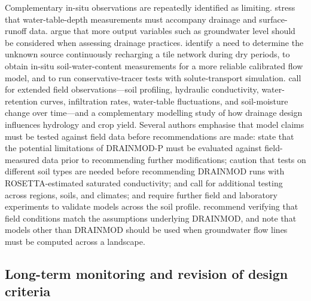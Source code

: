 \documentclass[11pt]{article}
\begin{document}
Complementary in-situ observations are repeatedly identified as limiting.
\textcite{Askar2020} stress that water-table-depth measurements must accompany
drainage and surface-runoff data. \textcite{Salo2017} argue that more output
variables such as groundwater level should be considered when assessing
drainage practices. \textcite{Varvaris2018} identify a need to determine the
unknown source continuously recharging a tile network during dry periods, to
obtain in-situ soil-water-content measurements for a more reliable calibrated
flow model, and to run conservative-tracer tests with solute-transport
simulation. \textcite{Hwang2024} call for extended field observations---soil
profiling, hydraulic conductivity, water-retention curves, infiltration rates,
water-table fluctuations, and soil-moisture change over time---and a
complementary modelling study of how drainage design influences hydrology and
crop yield. Several authors emphasise that model claims must be tested against
field data before recommendations are made: \textcite{Askar2021} state that
the potential limitations of DRAINMOD-P must be evaluated against
field-measured data prior to recommending further modifications;
\textcite{Salazar2008} caution that tests on different soil types are needed
before recommending DRAINMOD runs with ROSETTA-estimated saturated
conductivity; \textcite{Singh2020b} and \textcite{Malota2024} call for
additional testing across regions, soils, and climates; and
\textcite{Holbak2021} require further field and laboratory experiments to
validate models across the soil profile. \textcite{Sinai2006} recommend
verifying that field conditions match the assumptions underlying DRAINMOD, and
\textcite{He2002} note that models other than DRAINMOD should be used when
groundwater flow lines must be computed across a landscape.

\subsection{Long-term monitoring and revision of design criteria}
\end{document}
